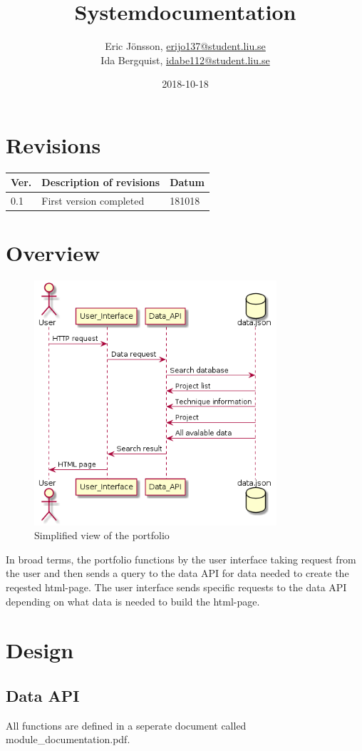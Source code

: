 \documentclass{TDP003mall}
\author{Eric Jönsson, \url{erijo137@student.liu.se}\\
  Ida Bergquist, \url{idabe112@student.liu.se}}
\title{Systemdocumentation}
\date{2018-10-18}
\begin{document}
\projectpage
\tableofcontents
\newpage
\section{Revisions}
\begin{table}[!h]
\begin{tabularx}{\linewidth}{|l|X|l|}
\hline
\textbf{Ver.} & \textbf{Description of revisions} & \textbf{Datum} \\\hline
    0.1 & First version completed & 181018 \\\hline
\end{tabularx}
\end{table}

\section{Overview}
\begin{figure}[h!]
    \centering
    \includegraphics[width=9cm]{sevenskdiagram.png}
    \caption{Simplified view of the portfolio}
    \label{sekvensdiagram}
\end{figure}
In broad terms, the portfolio functions by the user interface taking request from the user and then sends a query to the data API for data needed to create the reqested html-page.
The user interface sends specific requests to the data API depending on what data is needed to build the html-page.
\section{Design}
\subsection{Data API}
All functions are defined in a seperate document called module\_documentation.pdf.
\end{document}
